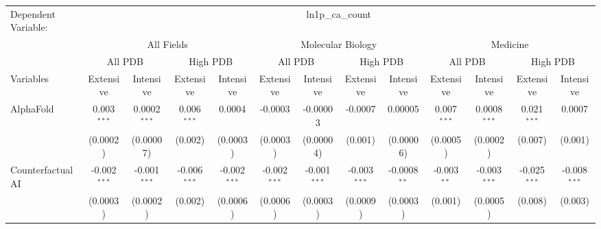 \begingroup
\centering
\begin{tabular}{lcccccccccccc}
   \tabularnewline \midrule \midrule
   Dependent Variable: & \multicolumn{12}{c}{ln1p\_ca\_count}\\
 & \multicolumn{4}{c}{All Fields} & \multicolumn{4}{c}{Molecular Biology} & \multicolumn{4}{c}{Medicine} \\
\cmidrule(lr){2-5} \cmidrule(lr){6-9} \cmidrule(lr){10-13}
 & \multicolumn{2}{c}{All PDB} & \multicolumn{2}{c}{High PDB} & \multicolumn{2}{c}{All PDB} & \multicolumn{2}{c}{High PDB} & \multicolumn{2}{c}{All PDB} & \multicolumn{2}{c}{High PDB} \\
\cmidrule(lr){2-3} \cmidrule(lr){4-5} \cmidrule(lr){6-7} \cmidrule(lr){8-9} \cmidrule(lr){10-11} \cmidrule(lr){12-13}
Variables & \multicolumn{1}{c}{Extensive} & \multicolumn{1}{c}{Intensive} & \multicolumn{1}{c}{Extensive} & \multicolumn{1}{c}{Intensive} & \multicolumn{1}{c}{Extensive} & \multicolumn{1}{c}{Intensive} & \multicolumn{1}{c}{Extensive} & \multicolumn{1}{c}{Intensive} & \multicolumn{1}{c}{Extensive} & \multicolumn{1}{c}{Intensive} & \multicolumn{1}{c}{Extensive} & \multicolumn{1}{c}{Intensive} \\
\cmidrule(lr){1-1}\cmidrule(lr){2-2} \cmidrule(lr){3-3} \cmidrule(lr){4-4} \cmidrule(lr){5-5} \cmidrule(lr){6-6} \cmidrule(lr){7-7} \cmidrule(lr){8-8} \cmidrule(lr){9-9} \cmidrule(lr){10-10} \cmidrule(lr){11-11} \cmidrule(lr){12-12} \cmidrule(lr){13-13}
   AlphaFold                                & 0.003$^{***}$  & 0.0002$^{***}$   & 0.006$^{***}$  & 0.0004          & -0.0003        & -0.00003         & -0.0007        & 0.00005        & 0.007$^{***}$ & 0.0008$^{***}$  & 0.021$^{***}$  & 0.0007\\   
                                            & (0.0002)       & (0.00007)        & (0.002)        & (0.0003)        & (0.0003)       & (0.00004)        & (0.001)        & (0.00006)      & (0.0005)      & (0.0002)        & (0.007)        & (0.001)\\   
   Counterfactual AI                        & -0.002$^{***}$ & -0.001$^{***}$   & -0.006$^{***}$ & -0.002$^{***}$  & -0.002$^{***}$ & -0.001$^{***}$   & -0.003$^{***}$ & -0.0008$^{**}$ & -0.003$^{**}$ & -0.003$^{***}$  & -0.025$^{***}$ & -0.008$^{***}$\\   
                                            & (0.0003)       & (0.0002)         & (0.002)        & (0.0006)        & (0.0006)       & (0.0003)         & (0.0009)       & (0.0003)       & (0.001)       & (0.0005)        & (0.008)        & (0.003)\\   

\end{tabular}
